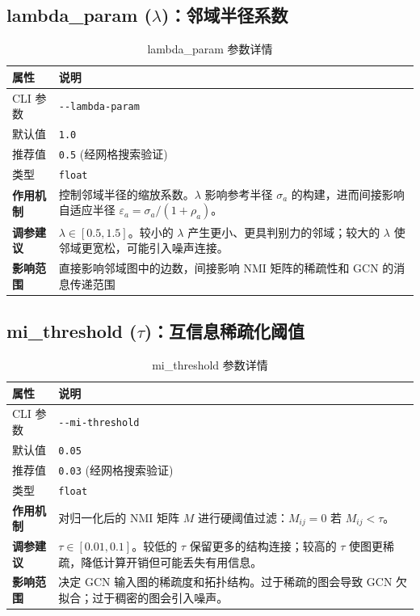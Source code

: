 \documentclass[11pt,a4paper]{ctexart}
\begin{document}
\subsection{lambda\_param ($\lambda$)：邻域半径系数}

\begin{table}[H]\centering\caption{lambda\_param 参数详情}\small
\begin{tabular}{lp{10cm}}
\toprule
属性 & 说明 \\
\midrule
CLI 参数 & \texttt{-{}-lambda-param} \\
默认值 & \texttt{1.0} \\
推荐值 & \texttt{0.5} (经网格搜索验证) \\
类型 & \texttt{float} \\
\midrule
\textbf{作用机制} & 控制邻域半径的缩放系数。$\lambda$ 影响参考半径 $\sigma_a$ 的构建，进而间接影响自适应半径 $\varepsilon_a = \sigma_a / (1 + \rho_a)$。 \\
\textbf{调参建议} & $\lambda \in [0.5, 1.5]$。较小的 $\lambda$ 产生更小、更具判别力的邻域；较大的 $\lambda$ 使邻域更宽松，可能引入噪声连接。\\
\textbf{影响范围} & 直接影响邻域图中的边数，间接影响 NMI 矩阵的稀疏性和 GCN 的消息传递范围 \\
\bottomrule
\end{tabular}\end{table}

\subsection{mi\_threshold ($\tau$)：互信息稀疏化阈值}

\begin{table}[H]\centering\caption{mi\_threshold 参数详情}\small
\begin{tabular}{lp{10cm}}
\toprule
属性 & 说明 \\
\midrule
CLI 参数 & \texttt{-{}-mi-threshold} \\
默认值 & \texttt{0.05} \\
推荐值 & \texttt{0.03} (经网格搜索验证) \\
类型 & \texttt{float} \\
\midrule
\textbf{作用机制} & 对归一化后的 NMI 矩阵 $M$ 进行硬阈值过滤：$M_{ij} = 0$ 若 $M_{ij} < \tau$。\\
\textbf{调参建议} & $\tau \in [0.01, 0.1]$。较低的 $\tau$ 保留更多的结构连接；较高的 $\tau$ 使图更稀疏，降低计算开销但可能丢失有用信息。\\
\textbf{影响范围} & 决定 GCN 输入图的稀疏度和拓扑结构。过于稀疏的图会导致 GCN 欠拟合；过于稠密的图会引入噪声。\\
\bottomrule
\end{tabular}\end{table}
\end{document}
